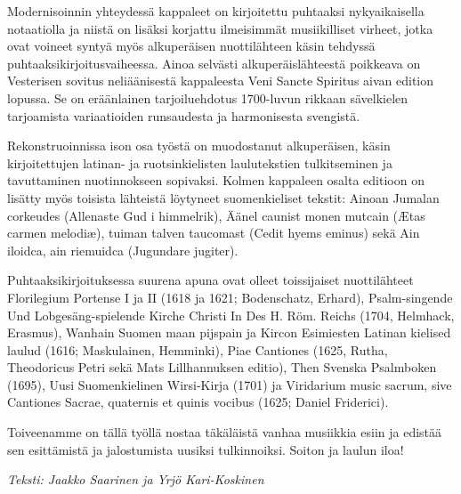 Modernisoinnin yhteydessä kappaleet on kirjoitettu puhtaaksi nykyaikaisella notaatiolla ja niistä on lisäksi korjattu ilmeisimmät musiikilliset virheet, jotka ovat voineet syntyä myös alkuperäisen nuottilähteen käsin tehdyssä puhtaaksikirjoitusvaiheessa. Ainoa selvästi alkuperäislähteestä poikkeava on Vesterisen sovitus neliäänisestä kappaleesta Veni Sancte Spiritus aivan edition lopussa. Se on eräänlainen tarjoiluehdotus 1700-luvun rikkaan sävelkielen tarjoamista variaatioiden runsaudesta ja harmonisesta svengistä.

Rekonstruoinnissa ison osa työstä on muodostanut alkuperäisen, käsin kirjoitettujen latinan- ja ruotsinkielisten laulutekstien tulkitseminen ja tavuttaminen nuotinnokseen sopivaksi. Kolmen kappaleen osalta editioon on lisätty myös toisista lähteistä löytyneet suomenkieliset tekstit: Ainoan Jumalan corkeudes (Allenaste Gud i himmelrik), Äänel caunist monen mutcain (Ætas carmen melodiæ), tuiman talven taucomast (Cedit hyems eminus) sekä Ain iloidca, ain riemuidca (Jugundare jugiter).

Puhtaaksikirjoituksessa suurena apuna ovat olleet toissijaiset nuottilähteet Florilegium Portense I ja II (1618 ja 1621; Bodenschatz, Erhard), Psalm-singende Und Lobgesäng-spielende Kirche Christi In Des H. Röm. Reichs (1704, Helmhack, Erasmus), Wanhain Suomen maan pijspain ja Kircon Esimiesten Latinan kielised laulud (1616; Maskulainen, Hemminki), Piae Cantiones (1625, Rutha, Theodoricus Petri sekä Mats Lillhannuksen editio), Then Svenska Psalmboken (1695), Uusi Suomenkielinen Wirsi-Kirja (1701) ja Viridarium music sacrum, sive Cantiones Sacrae, quaternis et quinis vocibus (1625; Daniel Friderici).

Toiveenamme on tällä työllä nostaa täkäläistä vanhaa musiikkia esiin ja edistää sen esittämistä ja jalostumista uusiksi tulkinnoiksi. Soiton ja laulun iloa!

\textit{Teksti: Jaakko Saarinen ja Yrjö Kari-Koskinen}
